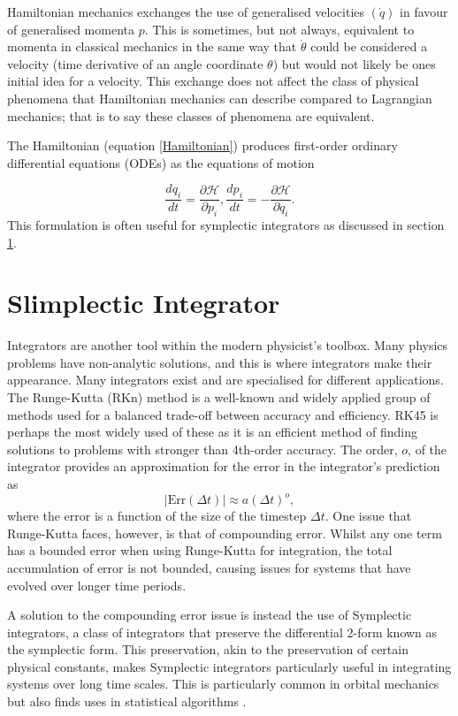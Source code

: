 \documentclass[10pt]{iopart}
\begin{document}
Hamiltonian mechanics exchanges the use of generalised velocities $(\dot q)$ in favour of generalised momenta $p$. This is sometimes, but not always, equivalent to momenta in classical mechanics in the same way that $\dot\theta$ could be considered a velocity (time derivative of an angle coordinate $\theta$) but would not likely be ones initial idea for a velocity. This exchange does not affect the class of physical phenomena that Hamiltonian mechanics can describe compared to Lagrangian mechanics; that is to say these classes of phenomena are equivalent.

The Hamiltonian (equation \ref{Hamiltonian}) produces first-order ordinary differential equations (ODEs) as the equations of motion

\begin{equation}
	\frac{dq_i}{dt} = \frac{\partial \mathcal H}{\partial p_i}, \frac{dp_i}{dt} = -\frac{\partial \mathcal H}{\partial q_i}.
\end{equation}
This formulation is often useful for symplectic integrators \cite{SanzSerna} as discussed in section \ref{Symplectic}.
\section{Slimplectic Integrator}
\label{Symplectic}
Integrators are another tool within the modern physicist's toolbox. Many physics problems have non-analytic solutions, and this is where integrators make their appearance. Many integrators exist and are specialised for different applications. The Runge-Kutta (RKn) method \cite{RungeKutta} is a well-known and widely applied group of methods used for a balanced trade-off between accuracy and efficiency. RK45 is perhaps the most widely used of these as it is an efficient method of finding solutions to problems with stronger than 4th-order accuracy. The order, $o$, of the integrator provides an approximation for the error in the integrator's prediction as 
\begin{equation}
\label{IntegratorOrder}
	|\textrm{Err}(\Delta t)| \approx a(\Delta t)^{o},
\end{equation}
where the error is a function of the size of the timestep $\Delta t$.
One issue that Runge-Kutta faces, however, is that of compounding error. Whilst any one term has a bounded error when using Runge-Kutta for integration, the total accumulation of error is not bounded, causing issues for systems that have evolved over longer time periods. 

A solution to the compounding error issue is instead the use of Symplectic integrators, a class of integrators that preserve the differential 2-form known as the symplectic form. This preservation, akin to the preservation of certain physical constants, makes Symplectic integrators particularly useful in integrating systems over long time scales. This is particularly common in orbital mechanics \cite{WISDOM, ReinTamayo} but also finds uses in statistical algorithms \cite{Neal_MCMC}.
\end{document}
